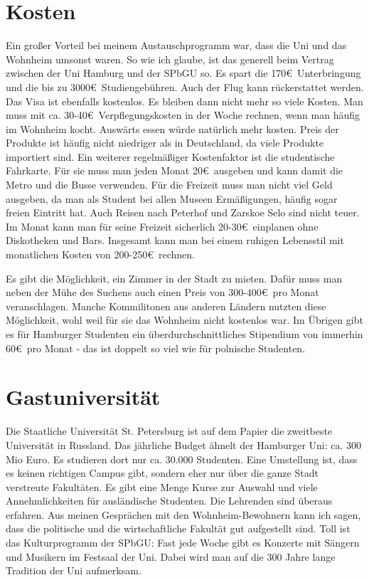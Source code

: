 \documentclass[a4paper]{scrartcl}
\begin{document}
\section*{Kosten}
Ein großer Vorteil bei meinem Austauschprogramm war, dass die Uni und das Wohnheim umsonst waren. So wie ich glaube, ist das generell beim Vertrag zwischen der Uni Hamburg und der SPbGU so. Es spart die 170\euro\  Unterbringung und die bis zu 3000\euro\ Studiengebühren. Auch der Flug kann rückerstattet werden. Das Visa ist ebenfalls kostenlos. 
Es bleiben dann nicht mehr so viele Kosten. Man muss mit ca. 30-40\euro\ Verpflegungskosten in der Woche rechnen, wenn man häufig im Wohnheim kocht. Auswärts essen würde natürlich mehr kosten. Preis der Produkte ist häufig nicht niedriger als in Deutschland, da viele Produkte importiert sind.
Ein weiterer regelmäßiger Kostenfaktor ist die studentische Fahrkarte. Für sie muss man jeden Monat 20\euro\ ausgeben und kann damit die Metro und die Busse verwenden. Für die Freizeit muss man nicht viel Geld ausgeben, da man als Student bei allen Museen Ermäßigungen, häufig sogar freien Eintritt hat. Auch Reisen nach Peterhof und Zarskoe Selo sind nicht teuer. Im Monat kann man für seine Freizeit sicherlich 20-30\euro\ einplanen ohne Diskotheken und Bars. Insgesamt kann man bei einem ruhigen Lebensstil mit monatlichen Kosten von 200-250\euro\ rechnen.

Es gibt die Möglichkeit, ein Zimmer in der Stadt zu mieten. Dafür muss man neben der Mühe des Suchens auch einen Preis von 300-400\euro\ pro Monat veranschlagen. Manche Kommilitonen aus anderen Ländern nutzten diese Möglichkeit, wohl weil für sie das Wohnheim nicht kostenlos war.
Im Übrigen gibt es für Hamburger Studenten ein überdurchschnittliches Stipendium von immerhin 60\euro\ pro Monat - das ist doppelt so viel wie für polnische Studenten. 
\section*{Gastuniversität}
Die Staatliche Universität St. Petersburg ist auf dem Papier die zweitbeste Universität in Russland. Das jährliche Budget ähnelt der Hamburger Uni: ca. 300 Mio Euro. Es studieren dort nur ca. 30.000 Studenten. Eine Umstellung ist, dass es keinen richtigen Campus gibt, sondern eher nur über die ganze Stadt verstreute Fakultäten. Es gibt eine Menge Kurse zur Auswahl und viele Annehmlichkeiten für ausländische Studenten. Die Lehrenden sind überaus erfahren. Aus meinen Gesprächen mit den Wohnheim-Bewohnern kann ich sagen, dass die politische und die wirtschaftliche Fakultät gut aufgestellt sind. Toll ist das Kulturprogramm  der SPbGU: Fast jede Woche gibt es Konzerte mit Sängern und Musikern im Festsaal der Uni. Dabei wird man auf die 300 Jahre lange Tradition der Uni aufmerksam.
\end{document}
